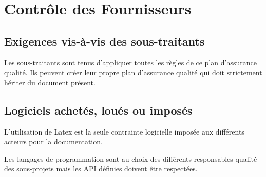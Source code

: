 \section{Contrôle des Fournisseurs}

\subsection{Exigences vis-à-vis des sous-traitants}
Les sous-traitants sont tenus d'appliquer toutes les règles de ce plan 
d'assurance qualité.
Ils peuvent créer leur propre plan d'assurance qualité qui doit strictement 
hériter du document présent.

\subsection{Logiciels achetés, loués ou imposés}
L'utilisation de Latex est la seule contrainte logicielle imposée aux 
différents acteurs pour la documentation.

Les langages de programmation sont au choix des différents responsables qualité
des sous-projets mais les API définies doivent être respectées.

\vfill
\pagebreak
